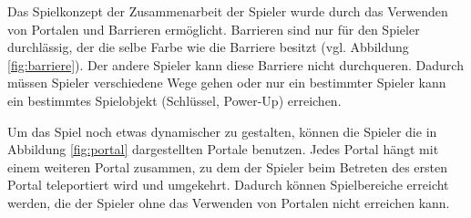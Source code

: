 Das Spielkonzept der Zusammenarbeit der Spieler wurde durch das Verwenden von Portalen und Barrieren ermöglicht. Barrieren sind nur für den Spieler durchlässig, der die selbe Farbe wie die Barriere besitzt (vgl. Abbildung \ref{fig:barriere}). Der andere Spieler kann diese Barriere nicht durchqueren. Dadurch müssen Spieler verschiedene Wege gehen oder nur ein bestimmter Spieler kann ein bestimmtes Spielobjekt (Schlüssel, Power-Up) erreichen.

Um das Spiel noch etwas dynamischer zu gestalten, können die Spieler die in Abbildung \ref{fig:portal} dargestellten Portale benutzen. Jedes Portal hängt mit einem weiteren Portal zusammen, zu dem der Spieler beim Betreten des ersten Portal teleportiert wird und umgekehrt. Dadurch können Spielbereiche erreicht werden, die der Spieler ohne das Verwenden von Portalen nicht erreichen kann.

